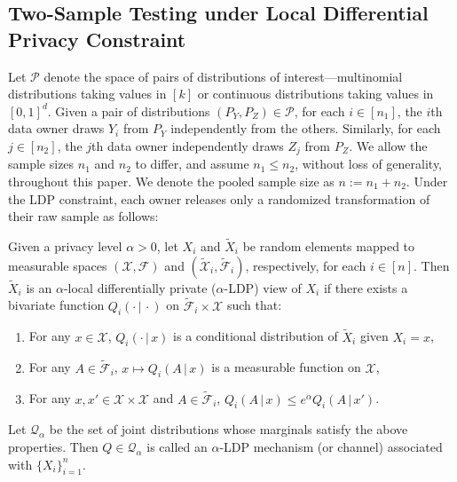 \documentclass[twoside,11pt]{article}
\newcommand{\distClassGeneric}{\mathcal{P}}
\newcommand{\rvOne}{X}
\newcommand{\sigmafield}{\mathcal{F}}
\newcommand{\sigmafieldPriv}{\tilde{\mathcal{F}}}
\newcommand{\rvX}{X} %
\newcommand{\rvXCodomain}{\mathcal{\rvX}} %
\newcommand{\rvXPrivCodomain}{\tilde{\rvXCodomain}}
\newcommand{\rvY}{Y}
\newcommand{\rvZ}{Z}
\newcommand{\sampleIndexOne}{i}
\newcommand{\sampleIndexTwo}{j}
\newcommand{\dimDensity}{d} %
\newcommand{\sampleSize}{n}
\newcommand{\privacyMechanism}{Q}
\newcommand{\privacyMechanismClass}{\mathcal{Q}}
\newcommand{\privacyParameter}{\alpha} %
\begin{document}
\subsection{Two-Sample Testing under Local Differential Privacy Constraint}\label{subsection:LDPtwosampleFormulation}
Let $\distClassGeneric$ denote the space of pairs of distributions of interest{---}multinomial distributions taking values in $[k]$ or continuous distributions taking values in $[0,1]^{\dimDensity}$. Given a pair of distributions $(P_\rvY, P_\rvZ) \in \distClassGeneric$, for each $\sampleIndexOne \in [\sampleSize_1]$, the $\sampleIndexOne$th  data owner draws $\rvY_\sampleIndexOne$ from $P_\rvY$ independently from the others. Similarly, for each $\sampleIndexTwo \in [\sampleSize_2]$,  the $\sampleIndexTwo$th data owner independently draws $\rvZ_\sampleIndexTwo$ from $P_\rvZ$.
We allow the sample sizes $\sampleSize_1$ and $\sampleSize_2$ to differ, and assume $\sampleSize_1 \leq \sampleSize_2$, without loss of generality, throughout this paper.  We denote the pooled sample size as $\sampleSize := \sampleSize_1 + \sampleSize_2$. Under the LDP constraint, each owner releases only a randomized transformation of their raw sample as follows:
\begin{definition}\label{def:LDP}
	Given a privacy level $\privacyParameter > 0$, let $X_i$ and $\tilde{X}_i$ be random elements  mapped to measurable spaces $(\rvXCodomain, \sigmafield)$ and $(\rvXPrivCodomain_i, \sigmafieldPriv_\sampleIndexOne)$, respectively, for each $i \in [n]$. Then $\tilde{X}_i$ is an $\privacyParameter$-local differentially private ($\privacyParameter$-LDP) view of $X_i$ if there exists a bivariate function $Q_\sampleIndexOne(\cdot \,|\, \cdot)$ on $\sigmafieldPriv_\sampleIndexOne \times \rvXCodomain$  such that:
	\begin{enumerate}
		\item For any $x \in \rvXCodomain$, $Q_\sampleIndexOne ( \cdot \,|\, x)$ is a conditional distribution of $\tilde{X}_i$ given $X_i=x$,
		\item For any $A \in \sigmafieldPriv_\sampleIndexOne$, $x \mapsto Q_\sampleIndexOne (A\,|\,x) $ is a measurable function on $\rvXCodomain$,~
		\item For any $x, x' \in \rvXCodomain \times \rvXCodomain$ and $A \in \sigmafieldPriv_i$, 
		$Q_\sampleIndexOne
		(
		A\,|\,x
		)  \leq  e^{\privacyParameter}	Q_\sampleIndexOne
		(
		A\,|\,
		x'
		)$.
	\end{enumerate}
	Let $\privacyMechanismClass_\privacyParameter$
	be the set of joint distributions whose marginals satisfy the above properties.
	Then $\privacyMechanism \in \privacyMechanismClass_\privacyParameter$ is called an $\privacyParameter$-LDP mechanism (or channel) associated with $\{\rvOne_\sampleIndexOne\}_{\sampleIndexOne=1}^\sampleSize$.
\end{definition}
\end{document}
